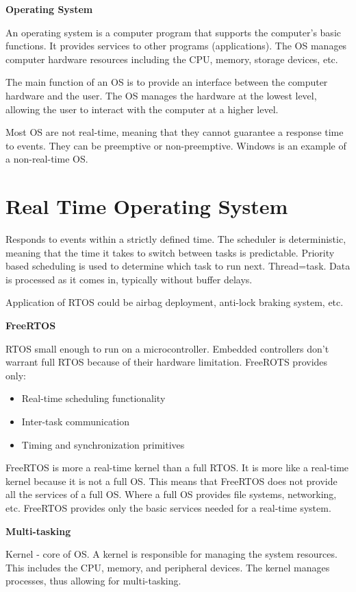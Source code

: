 \textbf{Operating System}

An operating system is a computer program that supports
the computer's basic functions. It provides services to other
programs (applications). The OS manages computer hardware resources
including the CPU, memory, storage devices, etc.

The main function of an OS is to provide an interface between
the computer hardware and the user. The OS manages the hardware
at the lowest level, allowing the user to interact with the computer
at a higher level.

Most OS are not real-time, meaning that they cannot guarantee a response
time to events. They can be preemptive or non-preemptive.
Windows is an example of a non-real-time OS.

\section{Real Time Operating System}

Responds to events within a strictly defined time.
The scheduler is deterministic, meaning that the time it takes to switch between tasks is predictable.
Priority based scheduling is used to determine which task to run next. Thread=task.
Data is processed as it comes in, typically without buffer delays.

Application of RTOS could be airbag deployment, anti-lock braking system, etc.

\textbf{FreeRTOS}

RTOS small enough to run on a microcontroller. Embedded controllers don't warrant full RTOS
because of their hardware limitation. FreeROTS provides only:

\begin{itemize}
	\item Real-time scheduling functionality
	\item Inter-task communication
	\item Timing and synchronization primitives
\end{itemize}

FreeRTOS is more a real-time kernel than a full RTOS.
It is more like a real-time kernel because it is not a full OS.
This means that FreeRTOS does not provide all the services of a full OS.
Where a full OS provides file systems, networking, etc.
FreeRTOS provides only the basic services needed for a real-time system.

\textbf{Multi-tasking}

Kernel - core of OS. A kernel is responsible for managing the system resources.
This includes the CPU, memory, and peripheral devices.
The kernel manages processes, thus allowing for multi-tasking.

